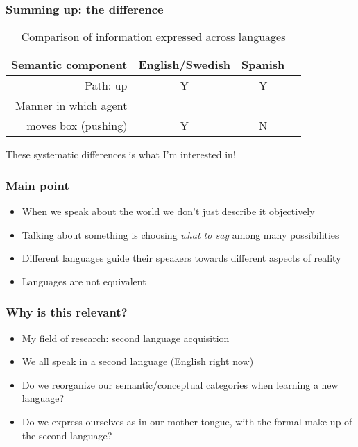 \documentclass[]{beamer}
\begin{document}
\begin{frame}
	\frametitle{Summing up: the difference}
	\begin{table}
		\begin{tabular}{r c c c}
		Semantic component	& English/Swedish	& Spanish \\
		\hline
		Path: up			& Y				& Y \\
		Manner in which agent \\moves box (pushing) & Y & N \\
		\end{tabular}
	\caption{Comparison of information expressed across languages}
	\end{table}
	\pause
	\begin{center}
	These systematic differences is what I'm interested in!
	\end{center}
\end{frame}


\begin{frame}
	\frametitle{Main point}
	\begin{itemize}
		\item When we speak about the world we don't just describe it objectively
		\item Talking about something is choosing \emph{what to say} among many possibilities
		\item Different languages guide their speakers towards different aspects of reality
		\item Languages are not equivalent
	\end{itemize}
\end{frame}




\begin{frame}
	\frametitle{Why is this relevant?}
	\begin{itemize}
		\item My field of research: second language acquisition
		\item We all speak in a second language (English right now)
		\item Do we reorganize our semantic/conceptual categories when learning a new language?
		\item Do we express ourselves as in our mother tongue, with the formal make-up of the second language?
	\end{itemize}
\end{frame}
\end{document}
